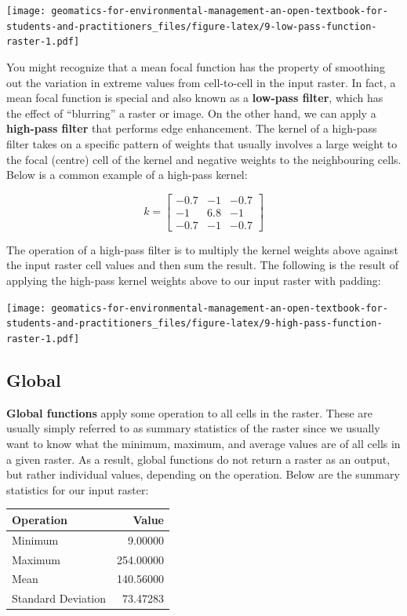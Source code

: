 \documentclass[
]{book}
\begin{document}
\texttt{[image: geomatics-for-environmental-management-an-open-textbook-for-students-and-practitioners\_files/figure-latex/9-low-pass-function-raster-1.pdf]}

You might recognize that a mean focal function has the property of smoothing out the variation in extreme values from cell-to-cell in the input raster. In fact, a mean focal function is special and also known as a \textbf{low-pass filter}, which has the effect of ``blurring'' a raster or image. On the other hand, we can apply a \textbf{high-pass filter} that performs edge enhancement. The kernel of a high-pass filter takes on a specific pattern of weights that usually involves a large weight to the focal (centre) cell of the kernel and negative weights to the neighbouring cells. Below is a common example of a high-pass kernel:

\[k = \begin{bmatrix}-0.7 & -1 & -0.7\\
-1 & 6.8 & -1\\
-0.7 & -1 & -0.7
\end{bmatrix}\]

The operation of a high-pass filter is to multiply the kernel weights above against the input raster cell values and then sum the result. The following is the result of applying the high-pass kernel weights above to our input raster with padding:

\texttt{[image: geomatics-for-environmental-management-an-open-textbook-for-students-and-practitioners\_files/figure-latex/9-high-pass-function-raster-1.pdf]}

\subsection{Global}\label{global}

\textbf{Global functions} apply some operation to all cells in the raster. These are usually simply referred to as summary statistics of the raster since we usually want to know what the minimum, maximum, and average values are of all cells in a given raster. As a result, global functions do not return a raster as an output, but rather individual values, depending on the operation. Below are the summary statistics for our input raster:

\begin{tabular}{lr}
\toprule
Operation & Value\\
\midrule
Minimum & 9.00000\\
Maximum & 254.00000\\
Mean & 140.56000\\
Standard Deviation & 73.47283\\
\bottomrule
\end{tabular}
\end{document}
